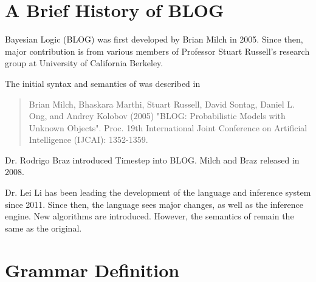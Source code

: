\appendix

{}


\section{A Brief  History of BLOG}\label{history-appendix}
Bayesian Logic (BLOG) was first developed by Brian Milch in 2005. Since then, major contribution is from various members of Professor Stuart Russell's research group at University of California Berkeley. 

The initial syntax and semantics of \bl was described in 

\begin{quote}
Brian Milch, Bhaskara Marthi, Stuart Russell, David Sontag, Daniel L. Ong, and Andrey Kolobov (2005) "BLOG: Probabilistic Models with Unknown Objects". Proc. 19th International Joint Conference on Artificial Intelligence (IJCAI): 1352-1359.
\end{quote}

Dr. Rodrigo Braz introduced Timestep into BLOG. Milch and Braz released  in 2008.

Dr. Lei Li has been leading the development of the language and \bl inference system since 2011. Since then, the language sees major changes, as well as the inference engine. New algorithms are introduced. However, the semantics of \bl remain the same as the original. 

\section{\bl Grammar Definition}\label{bnf-appendix}

